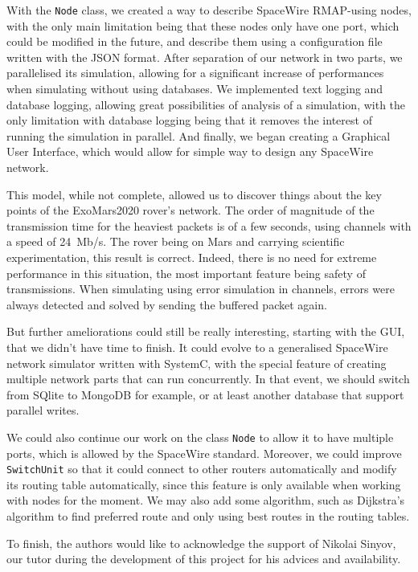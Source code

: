 \documentclass[12pt,a4paper]{article}
\begin{document}
With the \texttt{Node} class, we created a way to describe SpaceWire RMAP-using nodes, with the only main limitation being that these nodes only have one port, which could be modified in the future, and describe them using a configuration file written with the JSON format. After separation of our network in two parts, we parallelised its simulation, allowing for a significant increase of performances when simulating without using databases. We implemented text logging and database logging, allowing great possibilities of analysis of a simulation, with the only limitation with database logging being that it removes the interest of running the simulation in parallel. And finally, we began creating a Graphical User Interface, which would allow for simple way to design any SpaceWire network.\medbreak

This model, while not complete, allowed us to discover things about the key points of the ExoMars2020 rover's network. The order of magnitude of the transmission time for the heaviest packets is of a few seconds, using channels with a speed of \SI{24}{\mega b/\second}. The rover being on Mars and carrying scientific experimentation, this result is correct. Indeed, there is no need for extreme performance in this situation, the most important feature being safety of transmissions. When simulating using error simulation in channels, errors were always detected and solved by sending the buffered packet again.\medbreak

But further ameliorations could still be really interesting, starting with the GUI, that we didn't have time to finish. It could evolve to a generalised SpaceWire network simulator written with SystemC, with the special feature of creating multiple network parts that can run concurrently. In that event, we should switch from SQlite to MongoDB for example, or at least another database that support parallel writes.

We could also continue our work on the class \texttt{Node} to allow it to have multiple ports, which is allowed by the SpaceWire standard. Moreover, we could improve \texttt{SwitchUnit} so that it could connect to other routers automatically and modify its routing table automatically, since this feature is only available when working with nodes for the moment. We may also add some algorithm, such as Dijkstra's algorithm to find preferred route and only using best routes in the routing tables.\bigbreak

To finish, the authors would like to acknowledge the support of Nikolai Sinyov, our tutor during the development of this project for his advices and availability.

\pagebreak
\nocite{*}


\end{document}
